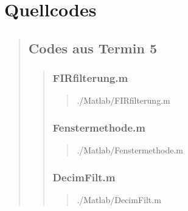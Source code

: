 \section{Quellcodes}
\begin{quote}

	\subsection{Codes aus Termin 5}
	\begin{quote}
	    \subsubsection{FIRfilterung.m}
	    \begin{quote}
	        
	            {./Matlab/FIRfilterung.m}
	    \end{quote}
	    
	    \subsubsection{Fenstermethode.m}
	    \begin{quote}
	        
	            {./Matlab/Fenstermethode.m}
	    \end{quote}
	    
	    \subsubsection{DecimFilt.m}
	    \begin{quote}
	        
	            {./Matlab/DecimFilt.m}
	    \end{quote}
	    
	\end{quote}
\end{quote}









